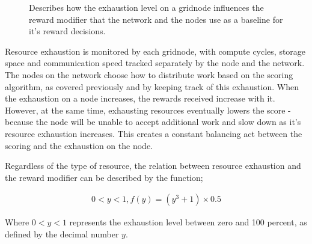 \documentclass[10pt,a4paper,final]{article}
\begin{document}
\begin{figure}[htb]
	\centering
		\caption{Describes how the exhaustion level on a \gls{gridnode} influences the reward modifier that the network and the nodes use as a baseline for it's reward decisions.}
\end{figure}

Resource exhaustion is monitored by each \gls{gridnode}, with compute cycles, storage space and communication speed tracked separately by the node and the network. The nodes on the network choose how to distribute work based on the scoring algorithm, as covered previously and by keeping track of this exhaustion. When the exhaustion on a node increases, the rewards received increase with it. However, at the same time, exhausting resources eventually lowers the score - because the node will be unable to accept additional work and slow down as it's resource exhaustion increases. This creates a constant balancing act between the scoring and the exhaustion on the node.

Regardless of the type of resource, the relation between resource exhaustion and the reward modifier can be described by the function;

\[
	\begin{array}{l}
	0 < y < 1, f(y) = (y^3 + 1) \times 0.5
	\end{array}	
\]

Where $0 < y < 1$ represents the exhaustion level between zero and 100 percent, as defined by the decimal number $y$.
\end{document}
